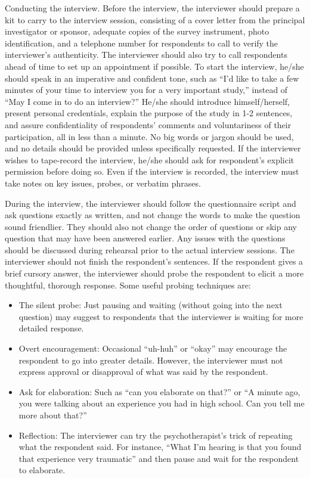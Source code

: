 Conducting the interview. Before the interview, the interviewer should prepare a kit to carry to the interview session, consisting of a cover letter from the principal investigator or sponsor, adequate copies of the survey instrument, photo identification, and a telephone number for respondents to call to verify the interviewer’s authenticity. The interviewer should also try to call respondents ahead of time to set up an appointment if possible. To start the interview, he/she should speak in an imperative and confident tone, such as “I’d like to take a few minutes of your time to interview you for a very important study,” instead of “May I come in to do an interview?” He/she should introduce himself/herself, present personal credentials, explain the purpose of the study in 1-2 sentences, and assure confidentiality of respondents’ comments and voluntariness of their participation, all in less than a minute. No big words or jargon should be used, and no details should be provided unless specifically requested. If the interviewer wishes to tape-record the interview, he/she should ask for respondent’s explicit permission before doing so. Even if the interview is recorded, the interview must take notes on key issues, probes, or verbatim phrases.

During the interview, the interviewer should follow the questionnaire script and ask questions exactly as written, and not change the words to make the question sound friendlier. They should also not change the order of questions or skip any question that may have been answered earlier. Any issues with the questions should be discussed during rehearsal prior to the actual interview sessions. The interviewer should not finish the respondent’s sentences. If the respondent gives a brief cursory answer, the interviewer should probe the respondent to elicit a more thoughtful, thorough response. Some useful probing techniques are:

\begin{itemize}
	\item The silent probe: Just pausing and waiting (without going into the next question) may suggest to respondents that the interviewer is waiting for more detailed response.
	\item Overt encouragement: Occasional “uh-huh” or “okay” may encourage the respondent to go into greater details. However, the interviewer must not express approval or disapproval of what was said by the respondent.
	\item Ask for elaboration: Such as “can you elaborate on that?” or “A minute ago, you were talking about an experience you had in high school. Can you tell me more about that?”
	\item Reflection: The interviewer can try the psychotherapist’s trick of repeating what the respondent said. For instance, “What I’m hearing is that you found that experience very traumatic” and then pause and wait for the respondent to elaborate.
\end{itemize}

